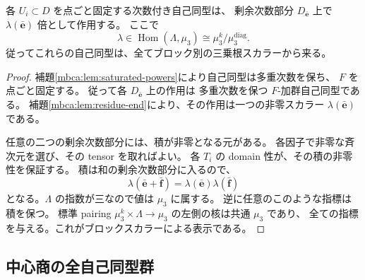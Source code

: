 \begin{proposition}[純部分を点ごと固定する自己同型]
\label{mbca:prop:pure-kernel}
各 $U_i\subset D$ を点ごと固定する次数付き自己同型は、
剰余次数部分 $D_{\bar{\boldsymbol e}}$ 上で
$\lambda(\bar{\boldsymbol e})$ 倍として作用する。
ここで
\[
 \lambda\in\operatorname{Hom}(\Lambda,\mu_3)
       \cong\mu_3^k/\mu_3^{\mathrm{diag}}.
\]
従ってこれらの自己同型は、全てブロック別の三乗根スカラーから来る。
\end{proposition}
\begin{proof}
補題\ref{mbca:lem:saturated-powers}により自己同型は多重次数を保ち、
$F$ を点ごと固定する。
従って各 $D_{\bar{\boldsymbol e}}$ 上の作用は
多重次数を保つ $F$-加群自己同型である。
補題\ref{mbca:lem:residue-end}により、その作用は一つの非零スカラー
$\lambda(\bar{\boldsymbol e})$ である。

任意の二つの剰余次数部分には、積が非零となる元がある。
各因子で非零な斉次元を選び、その tensor を取ればよい。
各 $T_i$ の domain 性が、その積の非零性を保証する。
積は和の剰余次数部分に入るので、
\[
 \lambda(\bar{\boldsymbol e}+\bar{\boldsymbol f})
    =\lambda(\bar{\boldsymbol e})\lambda(\bar{\boldsymbol f})
\]
となる。$\Lambda$ の指数が三なので値は $\mu_3$ に属する。
逆に任意のこのような指標は積を保つ。
標準 pairing
$\mu_3^k\times\Lambda\to\mu_3$ の左側の核は共通 $\mu_3$ であり、
全ての指標を与える。これがブロックスカラーによる表示である。
\end{proof}

\subsection{中心商の全自己同型群}

